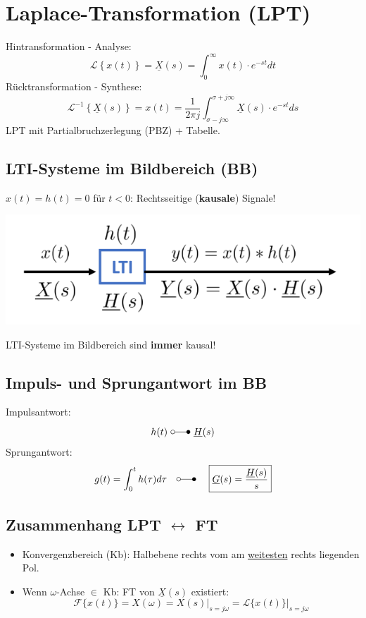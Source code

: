 \section{Laplace-Transformation (LPT)}
	Hintransformation - Analyse:
	\[
		 \mathcal{L}\left\{ x(t) \right\} = \boxed{ \underline{X}(s) = \int_0^\infty x(t) \cdot e^{-st} dt }
	\]
	Rücktransformation - Synthese:
	\[
		 \mathcal{L}^{-1}\left\{ \underline{X}(s) \right\} = x(t) =  \frac{1}{2\pi j}\int_{\sigma-j\infty}^{\sigma+j\infty} \underline{X}(s) \cdot e^{-st} ds
	\]
LPT mit Partialbruchzerlegung (PBZ) + Tabelle.

\normalsize
\subsection{LTI-Systeme im Bildbereich (BB)}
$x(t)=h(t)=0$ für $t<0$: Rechtsseitige (\textbf{kausale}) Signale!
\begin{center}
	\includegraphics[width=0.6\columnwidth]{Bilder/LTI_Systeme_im_Bildbereich.png}
\end{center}
LTI-Systeme im Bildbereich sind \textbf{immer} kausal!

\subsection{Impuls- und Sprungantwort im BB}
Impulsantwort:
\[
h(t)\ \laplace\ \underline{H}(s)
\]
Sprungantwort:
\[
g(t) = \int_0^t h(\tau) d\tau \quad \laplace\ \quad \boxed{\underline{G}(s) = \frac{\underline{H}(s)}{s}}
\]

\subsection{Zusammenhang LPT $\leftrightarrow$ FT}
\begin{itemize}
		\item Konvergenzbereich (Kb): Halbebene rechts vom am \underline{weitesten} rechts liegenden Pol.
	\item Wenn $\omega$-Achse $\in$ Kb: FT von $\underline{X}(s)$ existiert:
	\[
	\mathcal{F}\{x(t)\} = X(\omega) = X(s) \big|_{s=j\omega} = \mathcal{L}\{x(t)\} \big|_{s=j\omega}
	\]
\end{itemize}

